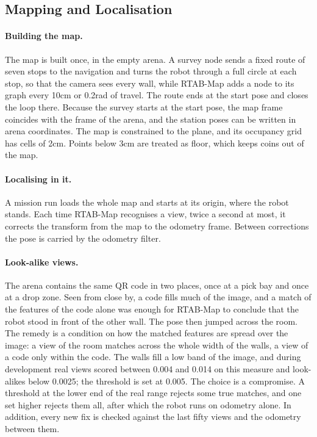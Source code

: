 \subsection{Mapping and Localisation}
\label{sec:slam}
\paragraph{Building the map.} The map is built once, in the empty arena. A survey node
sends a fixed route of seven stops to the navigation and turns the robot through a full
circle at each stop, so that the camera sees every wall, while RTAB-Map adds a node to its
graph every 10\unit{cm} or 0.2\unit{rad} of travel. The route ends at the start pose and
closes the loop there. Because the survey starts at the start pose, the map frame coincides
with the frame of the arena, and the station poses can be written in arena coordinates. The
map is constrained to the plane, and its occupancy grid has cells of 2\unit{cm}. Points
below 3\unit{cm} are treated as floor, which keeps coins out of the map.

\paragraph{Localising in it.} A mission run loads the whole map and starts at its origin,
where the robot stands. Each time RTAB-Map recognises a view, twice a second at most, it
corrects the transform from the map to the odometry frame. Between corrections the pose is
carried by the odometry filter.

\paragraph{Look-alike views.} The arena contains the same QR code in two places, once at a
pick bay and once at a drop zone. Seen from close by, a code fills much of the image, and a
match of the features of the code alone was enough for RTAB-Map to conclude that the robot
stood in front of the other wall. The pose then jumped across the room. The remedy is a
condition on how the matched features are spread over the image: a view of the room matches
across the whole width of the walls, a view of a code only within the code. The walls fill a
low band of the image, and during development real views scored between 0.004 and 0.014 on
this measure and look-alikes below 0.0025; the threshold is set at 0.005. The choice is a
compromise. A threshold at the lower end of the real range rejects some true matches, and
one set higher rejects them all, after which the robot runs on odometry alone. In addition,
every new fix is checked against the last fifty views and the odometry between them.

